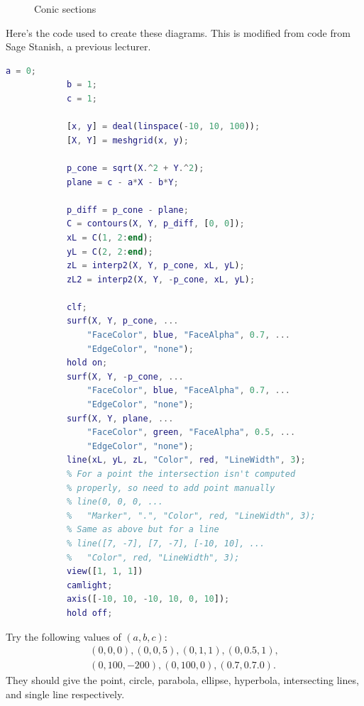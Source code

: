 \documentclass[fleqn]{LectureClass/LectureClass}
\begin{document}
\begin{figure}
        \caption{Conic sections}
        \label{fig:conic sections}
    \end{figure}
    
    \begin{cde}{}{}
        Here's the code used to create these diagrams.
        This is modified from code from Sage Stanish, a previous lecturer.
        
        \begin{lstlisting}[gobble=12, language=Matlab]
            a = 0;
            b = 1;
            c = 1;
            
            [x, y] = deal(linspace(-10, 10, 100));
            [X, Y] = meshgrid(x, y);
            
            p_cone = sqrt(X.^2 + Y.^2);
            plane = c - a*X - b*Y;
            
            p_diff = p_cone - plane;
            C = contours(X, Y, p_diff, [0, 0]);
            xL = C(1, 2:end);
            yL = C(2, 2:end);
            zL = interp2(X, Y, p_cone, xL, yL);
            zL2 = interp2(X, Y, -p_cone, xL, yL);
            
            clf;
            surf(X, Y, p_cone, ...
                "FaceColor", blue, "FaceAlpha", 0.7, ...
                "EdgeColor", "none");
            hold on;
            surf(X, Y, -p_cone, ...
                "FaceColor", blue, "FaceAlpha", 0.7, ...
                "EdgeColor", "none");
            surf(X, Y, plane, ...
                "FaceColor", green, "FaceAlpha", 0.5, ...
                "EdgeColor", "none");
            line(xL, yL, zL, "Color", red, "LineWidth", 3);
            % For a point the intersection isn't computed
            % properly, so need to add point manually
            % line(0, 0, 0, ...
            %   "Marker", ".", "Color", red, "LineWidth", 3);
            % Same as above but for a line
            % line([7, -7], [7, -7], [-10, 10], ...
            %   "Color", red, "LineWidth", 3);
            view([1, 1, 1])
            camlight;
            axis([-10, 10, -10, 10, 0, 10]);
            hold off;
        \end{lstlisting}
        
        Try the following values of \((a, b, c)\):
        \begin{gather*}
            (0, 0, 0), (0, 0, 5), (0, 1, 1), (0, 0.5, 1),\\
            (0, 100, -200), (0, 100, 0), (0.7, 0.7. 0).
        \end{gather*}
        They should give the point, circle, parabola, ellipse, hyperbola, intersecting lines, and single line respectively.
    \end{cde}
    
\end{document}
